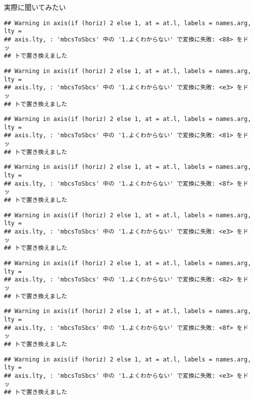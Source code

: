 \documentclass[ignorenonframetext,]{beamer}
\begin{document}
\begin{frame}[fragile]{実際に聞いてみたい}
\begin{verbatim}
## Warning in axis(if (horiz) 2 else 1, at = at.l, labels = names.arg, lty =
## axis.lty, : 'mbcsToSbcs' 中の '1.よくわからない' で変換に失敗: <88> をドッ
## トで置き換えました
\end{verbatim}

\begin{verbatim}
## Warning in axis(if (horiz) 2 else 1, at = at.l, labels = names.arg, lty =
## axis.lty, : 'mbcsToSbcs' 中の '1.よくわからない' で変換に失敗: <e3> をドッ
## トで置き換えました
\end{verbatim}

\begin{verbatim}
## Warning in axis(if (horiz) 2 else 1, at = at.l, labels = names.arg, lty =
## axis.lty, : 'mbcsToSbcs' 中の '1.よくわからない' で変換に失敗: <81> をドッ
## トで置き換えました
\end{verbatim}

\begin{verbatim}
## Warning in axis(if (horiz) 2 else 1, at = at.l, labels = names.arg, lty =
## axis.lty, : 'mbcsToSbcs' 中の '1.よくわからない' で変換に失敗: <8f> をドッ
## トで置き換えました
\end{verbatim}

\begin{verbatim}
## Warning in axis(if (horiz) 2 else 1, at = at.l, labels = names.arg, lty =
## axis.lty, : 'mbcsToSbcs' 中の '1.よくわからない' で変換に失敗: <e3> をドッ
## トで置き換えました
\end{verbatim}

\begin{verbatim}
## Warning in axis(if (horiz) 2 else 1, at = at.l, labels = names.arg, lty =
## axis.lty, : 'mbcsToSbcs' 中の '1.よくわからない' で変換に失敗: <82> をドッ
## トで置き換えました
\end{verbatim}

\begin{verbatim}
## Warning in axis(if (horiz) 2 else 1, at = at.l, labels = names.arg, lty =
## axis.lty, : 'mbcsToSbcs' 中の '1.よくわからない' で変換に失敗: <8f> をドッ
## トで置き換えました
\end{verbatim}

\begin{verbatim}
## Warning in axis(if (horiz) 2 else 1, at = at.l, labels = names.arg, lty =
## axis.lty, : 'mbcsToSbcs' 中の '1.よくわからない' で変換に失敗: <e3> をドッ
## トで置き換えました
\end{verbatim}


\end{frame}
\end{document}
